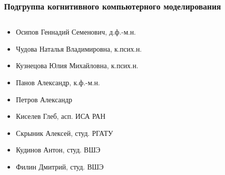 \documentclass[default]{beamer}
\begin{document}
	\begin{frame}
		\frametitle{Подгруппа когнитивного компьютерного моделирования}
		\begin{columns}
			\begin{column}{0.65\textwidth}
				\begin{itemize}
					\item Осипов Геннадий Семенович, д.ф.-м.н.
					\item Чудова Наталья Владимировна, к.псих.н.
					\item Кузнецова Юлия Михайловна, к.псих.н.
					\item Панов Александр, к.ф.-м.н.
					\item Петров Александр
					\item Киселев Глеб, асп. ИСА РАН
					\item Скрыник Алексей, студ. РГАТУ
					\item Кудинов Антон, студ. ВШЭ
					\item Филин Дмитрий, студ. ВШЭ
				\end{itemize}
			\end{column}
			\begin{column}{0.35\textwidth}
\end{column}
\end{columns}
\end{frame}
\end{document}
